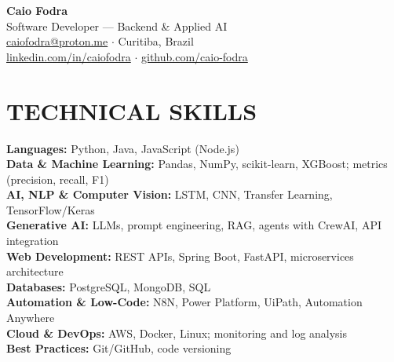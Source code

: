 \documentclass[11pt,a4paper]{article}
\begin{document}
\begin{center}
    {\LARGE\bfseries Caio Fodra} \\[4pt]
    Software Developer --- Backend \& Applied AI \\[6pt]
    \href{mailto:caiofodra@proton.me}{caiofodra@proton.me} \enspace$\cdot$\enspace
    Curitiba, Brazil \\[2pt]
    \href{https://linkedin.com/in/caiofodra}{linkedin.com/in/caiofodra} \enspace$\cdot$\enspace
    \href{https://github.com/caio-fodra}{github.com/caio-fodra}
\end{center}

\section{TECHNICAL SKILLS}
\noindent\textbf{Languages:} Python, Java, JavaScript (Node.js) \\
\textbf{Data \& Machine Learning:} Pandas, NumPy, scikit-learn, XGBoost; metrics (precision, recall, F1) \\
\textbf{AI, NLP \& Computer Vision:} LSTM, CNN, Transfer Learning, TensorFlow/Keras \\
\textbf{Generative AI:} LLMs, prompt engineering, RAG, agents with CrewAI, API integration \\
\textbf{Web Development:} REST APIs, Spring Boot, FastAPI, microservices architecture \\
\textbf{Databases:} PostgreSQL, MongoDB, SQL \\
\textbf{Automation \& Low-Code:} N8N, Power Platform, UiPath, Automation Anywhere \\
\textbf{Cloud \& DevOps:} AWS, Docker, Linux; monitoring and log analysis \\
\textbf{Best Practices:} Git/GitHub, code versioning
\end{document}
